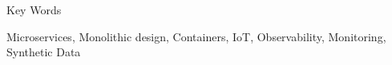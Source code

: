\pagestyle{plain}
\begin{center}
{\LARGE Key Words}\\[1cm]
\end{center}

Microservices, Monolithic design, Containers, IoT, Observability, Monitoring, Synthetic Data